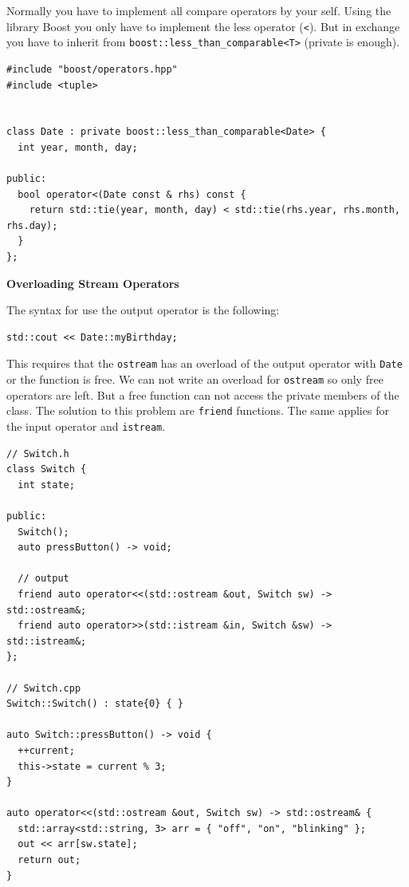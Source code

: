 \documentclass[11pt,twoside,landscape]{article}
\begin{document}
\begin{multicols}{3}
Normally you have to implement all compare operators by your self.
Using the library Boost you only have to implement the less operator (\texttt{<}).
But in exchange you have to inherit from \texttt{boost::less\_than\_comparable<T>} (private is enough).

\lstset{language=c++,label= ,caption= ,captionpos=b,numbers=none}
\begin{lstlisting}
#include "boost/operators.hpp"
#include <tuple>


class Date : private boost::less_than_comparable<Date> {
  int year, month, day; 

public:
  bool operator<(Date const & rhs) const {
    return std::tie(year, month, day) < std::tie(rhs.year, rhs.month, rhs.day);
  }
}; 
\end{lstlisting}

\textbf{Overloading Stream Operators}

The syntax for use the output operator is the following:
\lstset{language=c++,label= ,caption= ,captionpos=b,numbers=none}
\begin{lstlisting}
std::cout << Date::myBirthday;
\end{lstlisting}

This requires that the \texttt{ostream} has an overload of the output operator with \texttt{Date} or the function is free.
We can not write an overload for \texttt{ostream} so only free operators are left.
But a free function can not access the private members of the class.
The solution to this problem are \texttt{friend} functions.
The same applies for the input operator and \texttt{istream}.


\lstset{language=c++,label= ,caption= ,captionpos=b,numbers=none}
\begin{lstlisting}
// Switch.h
class Switch {
  int state;

public:
  Switch();
  auto pressButton() -> void;

  // output
  friend auto operator<<(std::ostream &out, Switch sw) -> std::ostream&;
  friend auto operator>>(std::istream &in, Switch &sw) -> std::istream&;
};

// Switch.cpp
Switch::Switch() : state{0} { }

auto Switch::pressButton() -> void {
  ++current;
  this->state = current % 3;
}

auto operator<<(std::ostream &out, Switch sw) -> std::ostream& {
  std::array<std::string, 3> arr = { "off", "on", "blinking" };
  out << arr[sw.state];
  return out;
}


\end{lstlisting}
\end{multicols}
\end{document}
